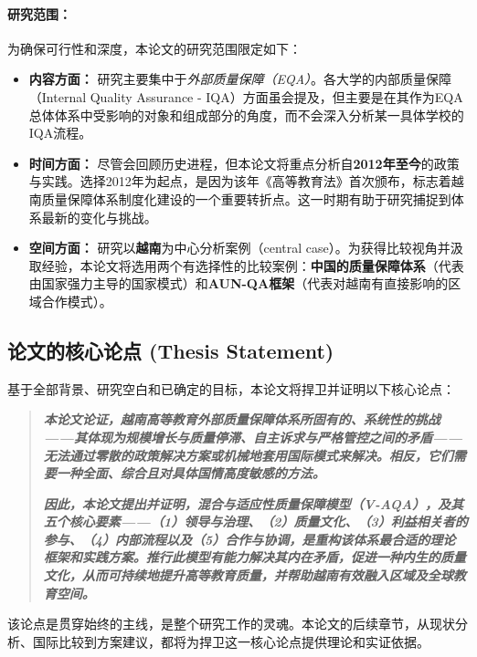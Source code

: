 \paragraph{研究范围：}
为确保可行性和深度，本论文的研究范围限定如下：
\begin{itemize}
    \item \textbf{内容方面：} 研究主要集中于\textit{外部质量保障（EQA）}。各大学的内部质量保障（Internal Quality Assurance - IQA）方面虽会提及，但主要是在其作为EQA总体体系中受影响的对象和组成部分的角度，而不会深入分析某一具体学校的IQA流程。
    
    \item \textbf{时间方面：} 尽管会回顾历史进程，但本论文将重点分析自\textbf{2012年至今}的政策与实践。选择2012年为起点，是因为该年《高等教育法》首次颁布，标志着越南质量保障体系制度化建设的一个重要转折点。这一时期有助于研究捕捉到体系最新的变化与挑战。
    
    \item \textbf{空间方面：} 研究以\textbf{越南}为中心分析案例（central case）。为获得比较视角并汲取经验，本论文将选用两个有选择性的比较案例：\textbf{中国的质量保障体系}（代表由国家强力主导的国家模式）和\textbf{AUN-QA框架}（代表对越南有直接影响的区域合作模式）。
\end{itemize}

\subsection{论文的核心论点 (Thesis Statement)}
\label{subsec:luan_diem_chinh}

基于全部背景、研究空白和已确定的目标，本论文将捍卫并证明以下核心论点：

\begin{quote}
\textit{\textbf{
本论文论证，越南高等教育外部质量保障体系所固有的、系统性的挑战——其体现为规模增长与质量停滞、自主诉求与严格管控之间的矛盾——无法通过零散的政策解决方案或机械地套用国际模式来解决。相反，它们需要一种全面、综合且对具体国情高度敏感的方法。
}}

\textit{\textbf{
因此，本论文提出并证明，混合与适应性质量保障模型（V-AQA），及其五个核心要素——（1）领导与治理、（2）质量文化、（3）利益相关者的参与、（4）内部流程以及（5）合作与协调，是重构该体系最合适的理论框架和实践方案。推行此模型有能力解决其内在矛盾，促进一种内生的质量文化，从而可持续地提升高等教育质量，并帮助越南有效融入区域及全球教育空间。
}}
\end{quote}

该论点是贯穿始终的主线，是整个研究工作的灵魂。本论文的后续章节，从现状分析、国际比较到方案建议，都将为捍卫这一核心论点提供理论和实证依据。

